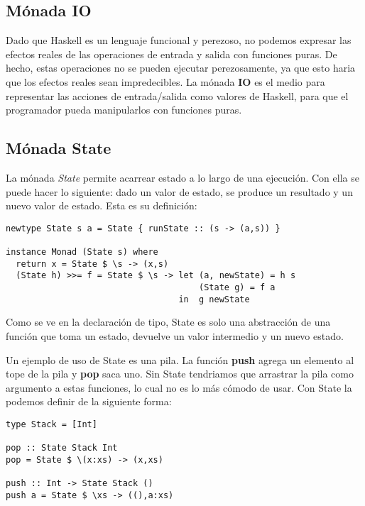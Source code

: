 \subsection{Mónada IO} %

Dado que Haskell es un lenguaje funcional y perezoso, no podemos expresar las
efectos reales de las operaciones de entrada y salida con funciones puras. De
hecho, estas operaciones no se pueden ejecutar perezosamente, ya que esto
haria que los efectos reales sean impredecibles. La mónada \textbf{IO} es el
medio para representar las acciones de entrada/salida como valores de Haskell,
para que el programador pueda manipularlos con funciones puras.


\label{sub:m_nada_io}



\subsection{Mónada State} %
\label{sub:m_nada_state}

La mónada \textit{State} permite acarrear estado a lo largo de una ejecución.
Con ella se puede hacer lo siguiente: dado un valor de estado, se produce un
resultado y un nuevo valor de estado. Esta es su definición:

\begin{lstlisting}
newtype State s a = State { runState :: (s -> (a,s)) }

instance Monad (State s) where
  return x = State $ \s -> (x,s)
  (State h) >>= f = State $ \s -> let (a, newState) = h s
                                      (State g) = f a
                                  in  g newState
\end{lstlisting}

Como se ve en la declaración de tipo, State es solo una abstracción
de una función que toma un estado, devuelve un valor intermedio y un nuevo
estado.

Un ejemplo de uso de State es una pila. La función \textbf{push}
agrega un elemento al tope de la pila y \textbf{pop} saca uno. Sin State
tendriamos que arrastrar la pila como argumento a estas funciones, lo cual
no es lo más cómodo de usar. Con State la podemos definir de la siguiente
forma:

\begin{lstlisting}
type Stack = [Int]

pop :: State Stack Int
pop = State $ \(x:xs) -> (x,xs)

push :: Int -> State Stack ()
push a = State $ \xs -> ((),a:xs)
\end{lstlisting}

